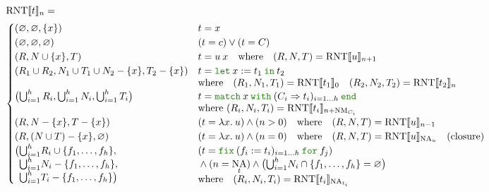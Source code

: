 \documentclass[a4paper,fleqn]{article}
\newcommand{\kwlet}{\mbox{\color{mygreen}\ttfamily let}}
\newcommand{\kwin}{\mbox{\color{mygreen}\ttfamily in}}
\newcommand{\kwmatch}{\mbox{\color{mygreen}\ttfamily match}}
\newcommand{\kwwith}{\mbox{\color{mygreen}\ttfamily with}}
\newcommand{\kwend}{\mbox{\color{mygreen}\ttfamily end}}
\newcommand{\kwfix}{\mbox{\color{mygreen}\ttfamily fix}}
\newcommand{\kwfor}{\mbox{\color{mygreen}\ttfamily for}}
\newcommand{\lam}[2]{\lambda #1.\:#2}
\newcommand{\letin}[3]{\kwlet\:#1:=#2\:\kwin\:#3}
\newcommand{\match}[4]{\kwmatch\:#1\:\kwwith\:(#2 \Rightarrow #3)_{#4}\:\kwend}
\newcommand{\fix}[4]{\kwfix\:(#1 := #2)_{#3}\:\kwfor\:#4}
\DeclareMathOperator{\NA}{NA} %
\DeclareMathOperator{\NM}{NM} %
\newcommand{\tbigcup}{{\textstyle\bigcup}}
\newcommand{\BRA}[1]{\llbracket #1 \rrbracket}
\DeclareMathOperator{\RNTop}{RNT}
\newcommand{\RNT}[2]{\RNTop\BRA{#1}_{#2}}
\begin{document}
\begin{align*}
  &\RNT{t}{n} = \\
  &\begin{cases}
    (\varnothing, \varnothing, \{x\})             & t = x \\
    (\varnothing, \varnothing, \varnothing)         & (t = c) \vee (t = C) \\
    (R, N \cup \{x\}, T)         & t = u\:x \quad \text{where}\quad (R,N,T) = \RNT{u}{n+1} \\
    (R_1 \cup R_2, N_1 \cup T_1 \cup N_2 - \{x\}, T_2 - \{x\})        &
      \begin{aligned}[t]
        & t = \letin{x}{t_1}{t_2} \\
        & \text{where}\quad (R_1,N_1,T_1) = \RNT{t_1}{0} \quad (R_2,N_2,T_2) = \RNT{t_2}{n}
      \end{aligned} \\
    \bigl(\bigcup_{i=1}^h R_i, \bigcup_{i=1}^h N_i, \bigcup_{i=1}^h T_i \bigr)         &
      \begin{aligned}[t]
        & t = \match{x}{C_i}{t_i}{i=1\ldots h} \\
        & \text{where}~(R_i, N_i, T_i) = \RNT{t_i}{n+\NM_{C_i}}
      \end{aligned} \\
    (R, N-\{x\}, T - \{x\})                                           & (t = \lam{x}{u}) \wedge (n > 0) \quad \text{where}\quad  (R, N, T) = \RNT{u}{n-1} \\
    (R, (N \cup T) - \{x\}, \varnothing)                             & (t = \lam{x}{u}) \wedge (n = 0) \quad \text{where}\quad  (R, N, T) = \RNT{u}{\NA_u} \quad \text{(closure)} \\
    \begin{aligned}[t]
      \bigl( & \tbigcup_{i=1}^h R_i \cup \{f_1,\dotsc, f_h\}, \\
             & \tbigcup_{i=1}^h N_i - \{f_1,\dotsc, f_h\}, \\
             & \tbigcup_{i=1}^h T_i - \{f_1,\dotsc, f_h\} \bigr)
    \end{aligned} &
      \begin{aligned}[t]
        & (t = \fix{f_i}{t_i}{i=1\ldots h}{f_j}) \\
        & {} \wedge (n = \NA_t) \wedge \bigl(\tbigcup_{i=1}^h N_i \cap \{f_1,\dotsc, f_h\} = \varnothing\bigr) \\
        & \text{where}\quad (R_i, N_i, T_i) = \RNT{t_i}{\NA_{t_i}}
      \end{aligned} \\

\end{cases}
\end{align*}
\end{document}

